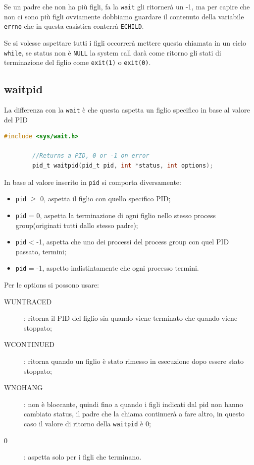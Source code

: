 \documentclass[a4paper, 12pt]{book}
\begin{document}
    Se un padre che non ha più figli, fa la \verb|wait| gli ritornerà 
    un -1, ma per capire che non ci sono più figli ovviamente 
    dobbiamo guardare il contenuto della variabile \verb|errno|
    che in questa casistica conterrà \verb|ECHILD|.

    Se si volesse aspettare tutti i figli occorrerà mettere questa 
    chiamata in un ciclo \verb|while|, se status non è \verb|NULL|
    la system call darà come ritorno gli stati di terminazione del figlio 
    come \verb|exit(1)| o \verb|exit(0)|.

    \subsection{waitpid}

    La differenza con la \verb|wait| è che questa aspetta un figlio 
    specifico in base al valore del PID
    \begin{lstlisting}[language=C]
        #include <sys/wait.h>

        //Returns a PID, 0 or -1 on error
        pid_t waitpid(pid_t pid, int *status, int options);
    \end{lstlisting}
    In base al valore inserito in \verb|pid| si comporta diversamente:
    \begin{itemize}
        \item \verb|pid| $\ge$ 0, aspetta il figlio con quello specifico PID;
        \item \verb|pid| = 0, aspetta la terminazione di ogni figlio nello stesso process group(originati tutti dallo stesso padre);
        \item \verb|pid| < -1, aspetta che uno dei processi del process group con quel PID passato, termini;
        \item \verb|pid| = -1, aspetto indistintamente che ogni processo termini.
    \end{itemize}
    Per le options si possono usare:
    \begin{description}
        \item[WUNTRACED]: ritorna il PID del figlio sia quando viene terminato che quando viene stoppato;
        \item[WCONTINUED]: ritorna quando un figlio è stato rimesso in esecuzione dopo essere stato stoppato;
        \item[WNOHANG]: non è bloccante, quindi fino a quando i figli indicati dal pid non hanno cambiato status, il padre che la chiama continuerà a fare altro, in questo caso il valore di ritorno della \verb|waitpid| è 0;
        \item[0]: aspetta solo per i figli che terminano.    
    \end{description}
\end{document}
